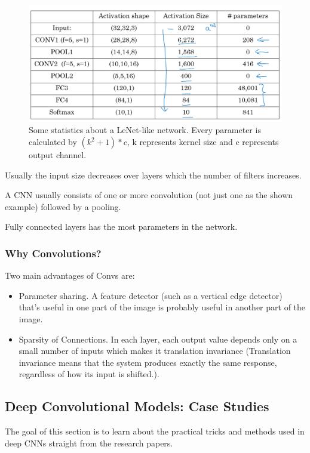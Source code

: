 \begin{figure}[!htbp]
    \centering
    \includegraphics[width=1.0\textwidth]{img/c4/cnn-examples.png}
    \caption{Some statistics about a LeNet-like network. Every parameter is calculated by $(k^2+1)*c$, k represents kernel size and c represents output channel.}
    \label{cnn-example}
\end{figure}

Usually the input size decreases over layers which the number of filters increases.

A CNN usually consists of one or more convolution (not just one as the shown example) followed by a pooling.

Fully connected layers has the most parameters in the network.

\subsubsection{Why Convolutions?}
Two main advantages of Convs are:

\begin{itemize}
    \item Parameter sharing. A feature detector (such as a vertical edge detector) that's useful in one part of the image is probably useful in another part of the image.
    \item Sparsity of Connections. In each layer, each output value depends only on a small number of inputs which makes it translation invariance (Translation invariance means that the system produces exactly the same response, regardless of how its input is shifted.).
\end{itemize}

\subsection{Deep Convolutional Models: Case Studies}
The goal of this section is to learn about the practical tricks and methods used in deep CNNs straight from the research papers.

